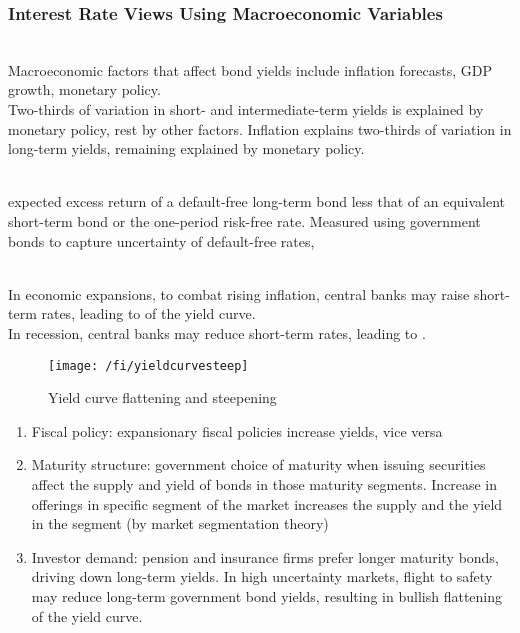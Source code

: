 \subsubsection{Interest Rate Views Using Macroeconomic Variables}

\begin{remark} \\
Macroeconomic factors that affect bond yields include inflation forecasts, GDP growth, monetary policy.\\
Two-thirds of variation in short- and intermediate-term yields is explained by monetary policy, rest by other factors. Inflation explains two-thirds of variation in long-term yields, remaining explained by monetary policy.
\end{remark}

\begin{definition} \\
expected excess return of a default-free long-term bond less that of an equivalent short-term bond or the one-period risk-free rate. Measured using government bonds to capture uncertainty of default-free rates,
\end{definition}

\begin{remark} \\
In economic expansions, to combat rising inflation, central banks may raise short-term rates, leading to  of the yield curve.\\
In recession, central banks may reduce short-term rates, leading to .
\end{remark}

\begin{figure}[H]
\centering
\texttt{[image: /fi/yieldcurvesteep]}
\caption{Yield curve flattening and steepening}
\end{figure}

\begin{remark} 
\begin{enumerate}[label=\roman*.]
\setlength{\itemsep}{0pt}
\item Fiscal policy: expansionary fiscal policies increase yields, vice versa
\item Maturity structure: government choice of maturity when issuing securities affect the supply and yield of bonds in those maturity segments. Increase in offerings in specific segment of the market increases the supply and the yield in the segment (by market segmentation theory)
\item Investor demand: pension and insurance firms prefer longer maturity bonds, driving down long-term yields. In high uncertainty markets, flight to safety may reduce long-term government bond yields, resulting in bullish flattening of the yield curve.
\end{enumerate}
\end{remark}

